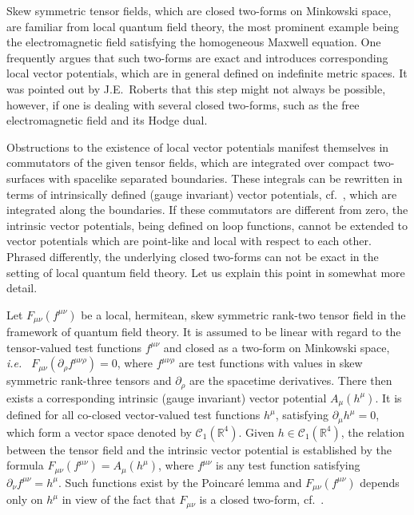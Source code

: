 \documentclass[11pt]{article}
\numberwithin{equation}{section}
\newcommand{\RR}{{\mathbb R}}
\newcommand{\Cc}{{\mathcal{C}}}
\def\ie{{\it i.e.\ }}
\begin{document}
Skew symmetric tensor fields, which are closed 
two-forms on Minkowski space, are 
familiar from local quantum field theory, the most 
prominent example being the electromagnetic field satisfying the 
homogeneous Maxwell equation. One frequently argues that such  
two-forms are exact and introduces 
corresponding local vector potentials, which are in general 
defined on indefinite metric spaces. It was pointed out 
by J.E.~Roberts \cite{Roberts} that this step might not always be   
possible, however, if one is dealing with several  
closed two-forms, such as the free electromagnetic field and its 
Hodge dual.  

\medskip
Obstructions to the existence of local vector potentials manifest 
themselves in commutators of the given tensor fields, which are integrated 
over \mbox{compact} two-surfaces with spacelike separated boundaries. 
These integrals can be rewritten in terms of intrinsically defined 
(gauge invariant) vector potentials, 
cf.\ \cite{BuCiRuVa1}, which are integrated along the boundaries.
If these commutators are different from zero, the intrinsic 
vector potentials, being defined on loop functions, cannot be 
extended to vector potentials which are point-like and local 
with respect to each other. Phrased differently, the underlying closed 
two-forms can not be exact in the setting of local quantum field
theory. Let us explain this point in somewhat more detail. 

\medskip 
Let $F_{\mu \nu}(f^{\mu \nu})$ be a local, hermitean, skew symmetric 
rank-two tensor field in the framework
of quantum field theory. It is assumed to be  
linear with regard to the tensor-valued test functions $f^{\mu \nu}$ and 
closed as a two-form on Minkowski space, \ie 
$F_{\mu \nu}(\partial_\rho f^{\mu \nu \rho}) = 0$, 
where $f^{\mu \nu \rho}$ are test functions with values in skew symmetric
rank-three tensors and $\partial_\rho$ are the
spacetime derivatives. There then exists
a corresponding intrinsic (gauge invariant) vector potential $A_\mu(h^\mu)$.
It is defined for all co-closed vector-valued 
test functions $h^\mu$, satisfying 
$\partial_\mu h^\mu = 0$, which form a 
vector space denoted by $\Cc_1(\RR^4)$. 
Given $h \in \Cc_1(\RR^4)$, the relation
between the tensor field and the intrinsic vector potential 
is established by the formula
$F_{\mu \nu}(f^{\mu \nu}) = A_\mu(h^\mu)$, where 
$f^{\mu \nu}$ is any test function satisfying
\mbox{$\partial_\nu f^{\mu \nu} = h^\mu$}.
Such functions exist by the Poincar\'e lemma and $F_{\mu \nu}(f^{\mu \nu})$
depends only on $h^\mu$ in view of the fact that 
$F_{\mu \nu}$ is a closed two-form, cf.\ \cite{BuCiRuVa1}.
\end{document}
